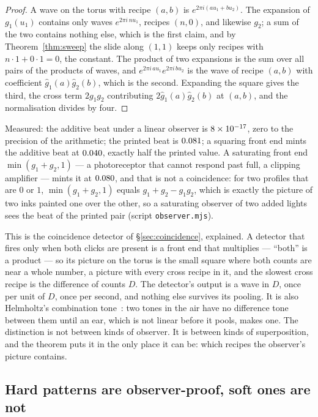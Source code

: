 \begin{proof}
A wave on the torus with recipe $(a,b)$ is $e^{2\pi i(au_1+bu_2)}$. The
expansion of $g_1(u_1)$ contains only waves $e^{2\pi i\,nu_1}$, recipes
$(n,0)$, and likewise $g_2$; a sum of the two contains nothing else, which
is the first claim, and by Theorem~\ref{thm:sweep} the slide along $(1,1)$
keeps only recipes with $n\cdot1+0\cdot1=0$, the constant. The product of
two expansions is the sum over all pairs of the products of waves, and
$e^{2\pi i\,au_1}e^{2\pi i\,bu_2}$ is the wave of recipe $(a,b)$ with
coefficient $\hat g_1(a)\hat g_2(b)$, which is the second. Expanding the
square gives the third, the cross term $2g_1g_2$ contributing
$2\hat g_1(a)\hat g_2(b)$ at $(a,b)$, and the normalisation divides by four.
\end{proof}

Measured: the additive beat under a linear observer is $8\times 10^{-17}$,
zero to the precision of the arithmetic; the printed beat is
$0.081$; a squaring front end mints the additive beat at
$0.040$, exactly half the printed value. A saturating front end
$\min(g_1+g_2,1)$ --- a photoreceptor that cannot respond past full, a
clipping amplifier --- mints it at $0.080$, and that is not a
coincidence: for two profiles that are $0$ or $1$, $\min(g_1+g_2,1)$ equals
$g_1+g_2-g_1g_2$, which is exactly the picture of two inks painted one over
the other, so a saturating observer of two added lights sees the beat of the
printed pair (script \texttt{observer.mjs}).

This is the coincidence detector of \S\ref{sec:coincidence}, explained. A
detector that fires only when both clicks are present is a front end that
multiplies --- ``both'' is a product --- so its picture on the torus is the
small square where both counts are near a whole number, a picture with
every cross recipe in it, and the slowest cross recipe is the difference of
counts $D$. The detector's output is a wave in $D$, once per unit of $D$,
once per second, and nothing else survives its pooling. It is also
Helmholtz's combination tone~\cite{Helmholtz1954Sensations}: two tones in
the air have no difference tone between them until an ear, which is not
linear before it pools, makes one. The distinction is not between kinds of
observer. It is between kinds of superposition, and the theorem puts it in
the only place it can be: which recipes the observer's picture contains.

\subsection{Hard patterns are observer-proof, soft ones are not}
\label{sec:hardsoft}

